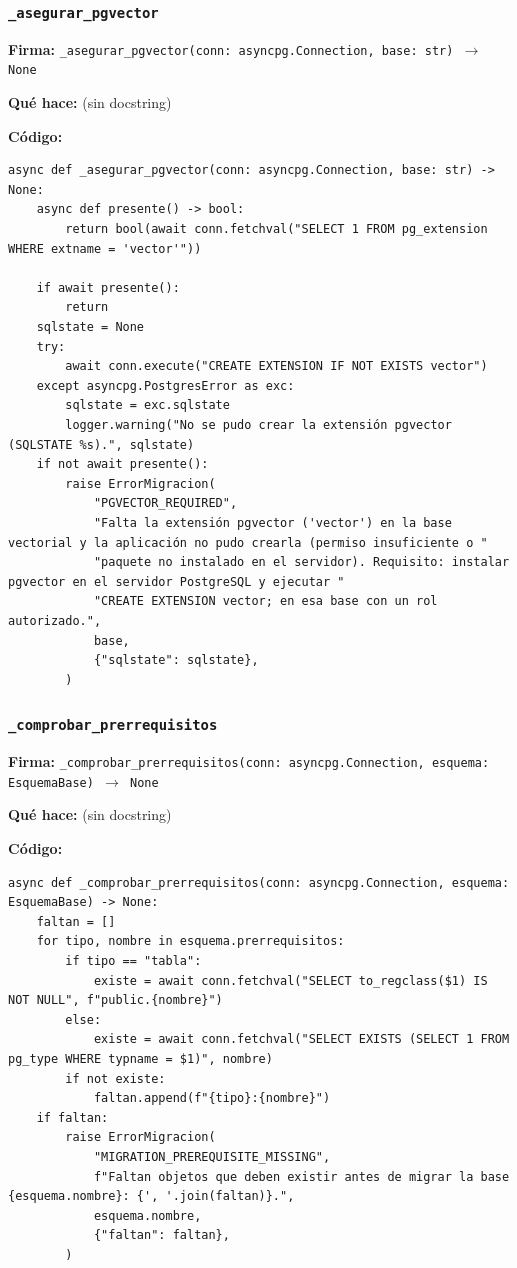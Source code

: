 \documentclass[11pt,a4paper]{article}
\begin{document}
\subsubsection*{\texttt{\_asegurar\_pgvector}}
\textbf{Firma:} \texttt{\_asegurar\_pgvector(conn: asyncpg.Connection, base: str) $\rightarrow$ None}

\textbf{Qué hace:} (sin docstring)

\textbf{Código:}
\begin{lstlisting}
async def _asegurar_pgvector(conn: asyncpg.Connection, base: str) -> None:
    async def presente() -> bool:
        return bool(await conn.fetchval("SELECT 1 FROM pg_extension WHERE extname = 'vector'"))

    if await presente():
        return
    sqlstate = None
    try:
        await conn.execute("CREATE EXTENSION IF NOT EXISTS vector")
    except asyncpg.PostgresError as exc:
        sqlstate = exc.sqlstate
        logger.warning("No se pudo crear la extensión pgvector (SQLSTATE %s).", sqlstate)
    if not await presente():
        raise ErrorMigracion(
            "PGVECTOR_REQUIRED",
            "Falta la extensión pgvector ('vector') en la base vectorial y la aplicación no pudo crearla (permiso insuficiente o "
            "paquete no instalado en el servidor). Requisito: instalar pgvector en el servidor PostgreSQL y ejecutar "
            "CREATE EXTENSION vector; en esa base con un rol autorizado.",
            base,
            {"sqlstate": sqlstate},
        )
\end{lstlisting}

\subsubsection*{\texttt{\_comprobar\_prerrequisitos}}
\textbf{Firma:} \texttt{\_comprobar\_prerrequisitos(conn: asyncpg.Connection, esquema: EsquemaBase) $\rightarrow$ None}

\textbf{Qué hace:} (sin docstring)

\textbf{Código:}
\begin{lstlisting}
async def _comprobar_prerrequisitos(conn: asyncpg.Connection, esquema: EsquemaBase) -> None:
    faltan = []
    for tipo, nombre in esquema.prerrequisitos:
        if tipo == "tabla":
            existe = await conn.fetchval("SELECT to_regclass($1) IS NOT NULL", f"public.{nombre}")
        else:
            existe = await conn.fetchval("SELECT EXISTS (SELECT 1 FROM pg_type WHERE typname = $1)", nombre)
        if not existe:
            faltan.append(f"{tipo}:{nombre}")
    if faltan:
        raise ErrorMigracion(
            "MIGRATION_PREREQUISITE_MISSING",
            f"Faltan objetos que deben existir antes de migrar la base {esquema.nombre}: {', '.join(faltan)}.",
            esquema.nombre,
            {"faltan": faltan},
        )
\end{lstlisting}
\end{document}
